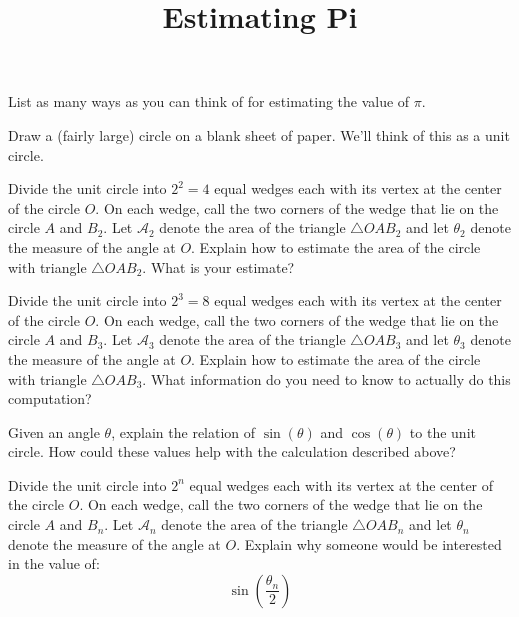 \documentclass[nooutcomes]{ximera}
\title{Estimating Pi}
\begin{document}
\begin{abstract}
\end{abstract}
\maketitle


\begin{question}
List as many ways as you can think of for estimating the value of $\pi$.
\end{question}


Draw a (fairly large) circle on a blank sheet of paper. We'll think of
this as a unit circle.


\begin{problem}
Divide the unit circle into $2^2 = 4$ equal wedges each with its vertex at
the center of the circle $O$.  On each wedge, call the two corners of
the wedge that lie on the circle $A$ and $B_2$.  Let $\mathcal{A}_2$
denote the area of the triangle $\triangle OAB_2$ and let $\theta_2$ denote the
measure of the angle at $O$. Explain how to estimate the area of the
circle with triangle $\triangle OAB_2$. What is your estimate?
\end{problem}

\begin{problem}
Divide the unit circle into $2^3 = 8$ equal wedges each with its vertex at
the center of the circle $O$.  On each wedge, call the two corners of
the wedge that lie on the circle $A$ and $B_3$.  Let $\mathcal{A}_3$
denote the area of the triangle $\triangle OAB_3$ and let $\theta_3$
denote the measure of the angle at $O$. Explain how to estimate the
area of the circle with triangle $\triangle OAB_3$. What information do
you need to know to actually do this computation?
\end{problem}

\begin{problem}
Given an angle $\theta$, explain the relation of $\sin(\theta)$ and
$\cos(\theta)$ to the unit circle. How could these values help with
the calculation described above?
\end{problem}

\begin{problem}
Divide the unit circle into $2^n$ equal wedges each with its vertex at
the center of the circle $O$.  On each wedge, call the two corners of
the wedge that lie on the circle $A$ and $B_n$.  Let $\mathcal{A}_n$
denote the area of the triangle $\triangle OAB_n$ and let $\theta_n$
denote the measure of the angle at $O$. Explain why someone would be
interested in the value of:
\[
\sin\left(\frac{\theta_n}{2}\right)
\]
\end{problem}
\end{document}
